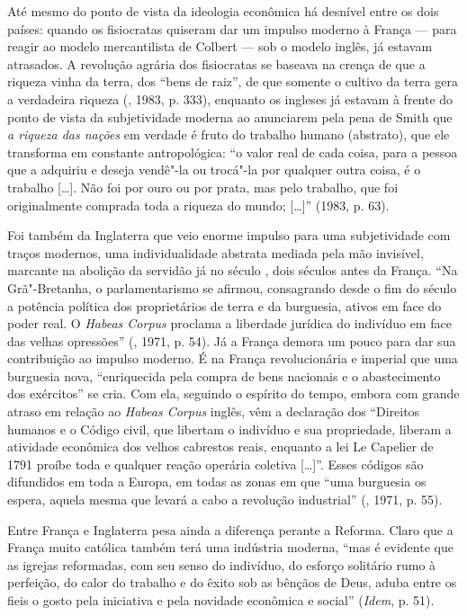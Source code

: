 Até mesmo do ponto de vista da ideologia econômica há desnível entre os
dois países: quando os fisiocratas quiseram dar um impulso moderno à
França --- para reagir ao modelo mercantilista de Colbert --- sob o modelo
inglês, já estavam atrasados. A revolução agrária dos fisiocratas se
baseava na crença de que a riqueza vinha da terra, dos ``bens de raiz'',
de que somente o cultivo da terra gera a verdadeira riqueza (,
1983, p. 333), enquanto os ingleses já estavam à frente do ponto de
vista da subjetividade moderna ao anunciarem pela pena de Smith que
\emph{a riqueza das nações} em verdade é fruto do trabalho humano
(abstrato), que ele transforma em constante antropológica: ``o valor
real de cada coisa, para a pessoa que a adquiriu e deseja vendê"-la ou
trocá"-la por qualquer outra coisa, é o trabalho [\ldots{}]. Não foi
por ouro ou por prata, mas pelo trabalho, que foi originalmente comprada
toda a riqueza do mundo; [\ldots{}]'' (1983, p. 63).

Foi também da Inglaterra que veio enorme impulso para uma subjetividade
com traços modernos, uma individualidade abstrata mediada pela mão
invisível, marcante na abolição da servidão já no século , dois
séculos antes da França. ``Na Grã"-Bretanha, o parlamentarismo se
afirmou, consagrando desde o fim do século  a potência política dos
proprietários de terra e da burguesia, ativos em face do poder real. O
\emph{Habeas Corpus} proclama a liberdade jurídica do indivíduo em face
das velhas opressões'' (, 1971, p. 54). Já a França demora um pouco
para dar sua contribuição ao impulso moderno. É na França revolucionária
e imperial que uma burguesia nova, ``enriquecida pela compra de bens
nacionais e o abastecimento dos exércitos'' se cria. Com ela, seguindo o
espírito do tempo, embora com grande atraso em relação ao \emph{Habeas
Corpus} inglês, vêm a declaração dos ``Direitos humanos e o Código
civil, que libertam o indivíduo e sua propriedade, liberam a atividade
econômica dos velhos cabrestos reais, enquanto a lei Le Capelier de 1791
proíbe toda e qualquer reação operária coletiva [\ldots{}]''. Esses
códigos são difundidos em toda a Europa, em todas as zonas em que ``uma
burguesia os espera, aquela mesma que levará a cabo a revolução
industrial'' (, 1971, p. 55).

Entre França e Inglaterra pesa ainda a diferença perante a Reforma.
Claro que a França muito católica também terá uma indústria moderna,
``mas é evidente que as igrejas reformadas, com seu senso do indivíduo,
do esforço solitário rumo à perfeição, do calor do trabalho e do êxito
sob as bênçãos de Deus, aduba entre os fieis o gosto pela iniciativa e
pela novidade econômica e social'' (\emph{Idem}, p. 51).

